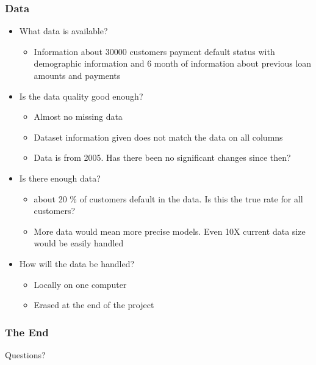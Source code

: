 \documentclass[10pt]{beamer}
\begin{document}
\begin{frame}
\frametitle{Data}

\begin{itemize}
    \item What data is available?
    \pause
    \begin{itemize}
        \item Information about 30000 customers payment default status with
        demographic information and 6 month of information about previous loan amounts
        and payments
        \pause
    \end{itemize}
    \item Is the data quality good enough?
    \pause
    \begin{itemize}
        \item Almost no missing data
        \pause
        \item Dataset information given does not match the data on all columns
        \pause
        \item Data is from 2005. Has there been no significant changes since then?
        \pause
    \end{itemize}
    \item Is there enough data?
    \pause
    \begin{itemize}
        \item about 20 \% of customers default in the data.
        Is this the true rate for all customers?
        \pause
        \item More data would mean more precise models.
        Even 10X current data size would be easily handled
        \pause
    \end{itemize}
    \item How will the data be handled?
    \pause
    \begin{itemize}
        \item Locally on one computer
        \pause
        \item Erased at the end of the project
    \end{itemize}
\end{itemize}

\end{frame}

\begin{frame}
\frametitle{The End}

\LARGE{\centerline{Questions?}}

\end{frame}

\end{document}
